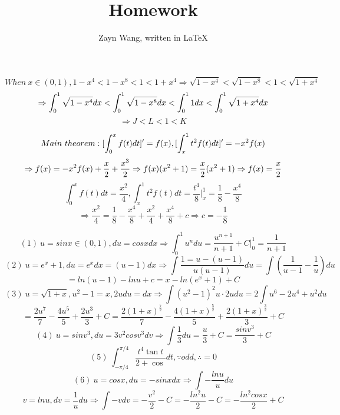 \documentclass{homework}
\author{Zayn Wang, written in \LaTeX}
\title{Homework}
\begin{document}
 \maketitle

\newcommand\degree{^\circ}

\newcommand\rarr{\rightarrow}

\newcommand\rArr{\Rightarrow}



\question

$$ When \ x \in (0, 1), 1 - x^4 < 1 - x^8 < 1 < 1 + x^4 \rArr \sqrt{1 - x^4} < \sqrt{1 - x^8} < 1 < \sqrt{1 + x^4}
$$
$$ \rArr \int_{0}^{1}{\sqrt{1 - x^4}}dx < \int_{0}^{1}{\sqrt{1 - x^8}}dx < \int_{0}^{1}{1}dx < \int_{0}^{1}{\sqrt{1 + x^4}}dx \\
$$
$$ \rArr J < L < 1 < K
$$

\question


$$ Main \ theorem: [\int_{0}^{x}f(t)dt]' = f(x), [\int_{x}^{1}{t^2f(t)}dt]' = - x^2 f(x) \\
$$
$$ \rArr f(x) = -x^2f(x) + \frac{x}{2} + \frac{x^3}{2}  \rArr f(x)(x^2 + 1) = \frac{x}{2}(x^2 + 1) \rArr f(x) = \frac{x}{2} \\
$$
$$ \int_{0}^{x}f(t)dt = \frac{x^2}{4}, \int_{x}^{1}{t^2f(t)}dt = \frac{t^4}{8}|_{x}^{1} = \frac{1}{8} - \frac{x^4}{8}
$$
$$ \rArr \frac{x^2}{4} = \frac{1}{8} - \frac{x^4}{8} + \frac{x^2}{4} + \frac{x^4}{8} + c \rArr c = -\frac{1}{8}
$$

\question

$$ (1) \ u = sinx \in (0, 1) , du = cosx dx \rArr \int_{0}^{1}u^ndu = \frac{u^{n+1}}{n+1} + C |_0^1 = \frac{1}{n + 1}
$$
$$ (2) \ u = e^x + 1, du = e^x dx = (u - 1) dx \rArr \int{\frac{1 = u - (u - 1)}{u(u - 1)}}du = \int{(\frac{1}{u - 1} - \frac{1}{u})}du 
$$
$$ = ln(u - 1) - lnu + c = x - ln(e^x +1) + C
$$
$$ (3) \ u = \sqrt{1 + x}, u^2 - 1 = x, 2u du = dx \rArr \int{(u^2 - 1)^2 u \cdot 2u}du = 2\int{u^6 - 2u^4 + u^2}du 
$$
$$ = \frac{2u^7}{7} - \frac{4u^5}{5} + \frac{2u^3}{3} + C = \frac{2(1 + x)^\frac{7}{2}}{7} - \frac{4(1 + x)^\frac{5}{2}}{5} + \frac{2(1 + x)^\frac{3}{2}}{3} + C
$$
$$ (4) \ u = sinv^3, du = 3v^2cosv^3 dv \rArr \int{\frac{1}{3}}du = \frac{u}{3} + C = \frac{sinv^3}{3} + C
$$
$$ (5) \ \int_{-\pi/4}^{\pi/4}{\frac{t^4\tan{t}}{2 + \cos{}}}dt, \because odd, \therefore = 0
$$
$$ (6) \ u = cosx, du = -sinx dx \rArr \int{-\frac{lnu}{u}}du
$$
$$ v = lnu, dv = \frac{1}{u} du \rArr \int{-v dv} = - \frac{v^2}{2} - C = -\frac{ln^2u}{2} - C = -\frac{ln^2cosx}{2} + C
$$
\end{document}
